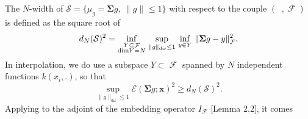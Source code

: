 \documentclass[twoside,11pt]{book}
\DeclareMathOperator{\F}{\mathcal{F}}
\DeclareMathOperator{\Ltwo}{\mathbb{L}_{2}(\mathrm{d} \omega)}
\newcommand{\rb}[1]{\textcolor{magenta}{#1}}
\begin{document}
 The $N$-width of $\mathcal{S} = \{ \mu_{g} = \bm{\bm{\Sigma}}g, \: \|g\|_{\Ltwo} \leq 1\}$ with respect to the couple $(\Ltwo, \F)$ \citep[Chapter 1.7]{Pin12} is defined as the square root of
\begin{equation}
	d_{N}(\mathcal{S})^{2}  = \inf\limits_{\substack{Y \subset \F\\ \mathrm{dim}Y = N}}\, \sup\limits_{\|g\|_{\mathrm{d}\omega} \leq 1}\, \inf\limits_{y \in Y}\, \|\bm{\Sigma} g -y \|_{\F}^{2}.  \\
\end{equation}
In interpolation, we do use a subspace $Y \subset \F$ spanned by $N$ independent functions $k(x_{i},.)$, so that
\begin{equation}
\sup\limits_{\|g\|_{\mathrm{d}\omega} \leq 1} \mathcal{E}(\bm{\Sigma} g;\bm{x})^{2} \geq d_{N}(\mathcal{S})^{2}.
\end{equation}
Applying \citep[Theorem 2.2, Chapter 4]{Pin12} to the adjoint of the embedding operator $I_{\F}$ \cite{StSc12}[Lemma 2.2], it comes
%
\end{document}

